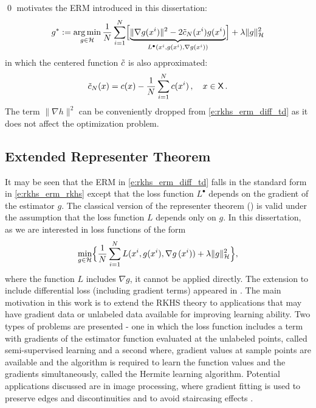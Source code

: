 \qed
{} motivates the ERM introduced in this dissertation:	
\begin{equation}
g^*  := \argmin_{g \in \clH} \frac{1}{N} \sum_{i=1}^N\Bigl[ \underbrace{\| \nabla g(x^i) \|^2 - 2 \tilc_N(x^i)g(x^i)}_{L^\bullet (x^i, g(x^i), \nabla g(x^i))}\Bigr] + \lambda \|g\|^2_\clH
\label{e:rkhs_erm_diff_td}
\end{equation}
in which the centered function $\tilde c$ is also approximated:
\[
\tilc_N(x) = c(x) - \frac{1}{N}  \sum_{i=1}^N  c(x^i)\,,\quad x\in\state\, .
\label{e:rkhs_tilc_N}
\]
The term $\| \nabla h \|^2$ can be conveniently dropped from \eqref{e:rkhs_erm_diff_td} as it does not affect the optimization problem.

\subsection{Extended Representer Theorem}
\label{s:ext_rep_theorem}
It may be seen that the ERM in \eqref{e:rkhs_erm_diff_td} falls in the standard form in \eqref{e:rkhs_erm_rkhs} except that the loss function $L^\bullet$ depends on the gradient of the estimator $g$. The classical version of the representer theorem () is valid under the assumption that the loss function $L$ depends only on $g$. In this dissertation, as we are interested in loss functions of the form 
\begin{equation}
\min_{g\in\clH} \Bigl\{  \frac{1}{N} \sum_{i=1}^N L(x^i,  g(x^i), \nabla g\, (x^i))     + \lambda \| g\|^2_{\clH}  \Bigr\},
\label{e:rkhs_erm_rkhs_gradient}
\end{equation}
where the function $L$ includes $\nabla g$, it cannot be applied directly. The extension to include differential loss (including gradient terms) appeared in \cite{zho08}. The main motivation in this work is to extend the RKHS theory to applications that may have gradient data or unlabeled data available for improving learning ability. Two types of problems are presented - one in which the loss function includes a term with gradients of the estimator function evaluated at the unlabeled points, called semi-supervised learning and a second where, gradient values at sample points are available and the algorithm is required to learn the function values and the gradients simultaneously, called the Hermite learning algorithm. Potential applications discussed are in image processing, where gradient fitting is used to preserve edges and discontinuities and to avoid staircasing effects \cite{didsetste09}. 
 
